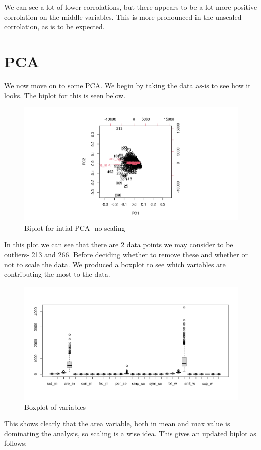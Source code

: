 \documentclass{amsart}
\begin{document}
We can see a lot of lower corrolations, but there appears to be a lot more positive corrolation on the middle variables. This is more pronounced in the unscaled corrolation, as is to be expected.

\section{PCA}
We now move on to some PCA. We begin by taking the data as-is to see how it looks. The biplot for this is seen below.

\begin{figure}[h]
    \centering
    \includegraphics[width=0.85\linewidth]{../../figs/hw2/pcanonscale.png}
    \caption{Biplot for intial PCA- no scaling}
\end{figure}

In this plot we can see that there are 2 data points we may consider to be outliers- 213 and 266. Before deciding whether to remove these and whether or not to scale the data. We produced a boxplot to see which variables are contributing the most to the data.

\begin{figure}[h]
    \centering
    \includegraphics[width=0.8\linewidth]{../../figs/hw2/boxplot.png}
    \caption{Boxplot of variables}
\end{figure}

This shows clearly that the area variable, both in mean and max value is dominating the analysis, so scaling is a wise idea. This gives an updated biplot as follows:
\end{document}
